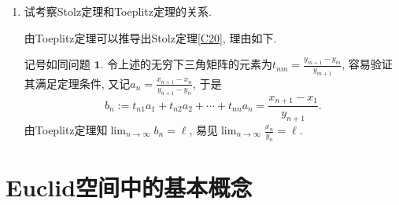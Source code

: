 \begin{2b}
\begin{enumerate}
\begin{proof}
(ii)由题设知\(\lim_{n\rightarrow\infty}\left(x_n-a\right)=0\), 而
\[z_n:=t_{n1}(x_1-a)+t_{n2}(x_2-a)+\cdots+t_{nn}(x_n-a)=y_n-aT_n,\]
由前面的结论知\(\lim_{n\rightarrow n\rightarrow}z_n=0\), 
于是\(\lim_{n\rightarrow\infty}y_n=\lim_{n\rightarrow\infty}z_n+a\lim_{n\rightarrow\infty}T_n=a.\)
\end{proof}
\item 试考察Stolz定理和Toeplitz定理的关系.

由Toeplitz定理可以推导出Stolz定理\ref{C20}, 理由如下.

记号如同问题 \(\boldsymbol{1}\). 令上述的无穷下三角矩阵的元素为\(t_{nm}=\frac{y_{m+1}-y_{m}}{y_{m+1}}\), 
容易验证其满足定理条件, 又记\(a_n=\frac{x_{n+1}-x_n}{y_{n+1}-y_n}\), 于是
\[b_n:=t_{n1}a_1+t_{n2}a_2+\cdots+t_{nn}a_n=\frac{x_{n+1}-x_1}{y_{n+1}}.\]
由Toeplitz定理知\(\lim_{n\rightarrow\infty}b_n=\ell\), 
易见\(\lim_{n\rightarrow\infty}\frac{x_n}{y_n}=\ell.\)
\end{enumerate}
\end{2b}

\section{Euclid空间中的基本概念}
